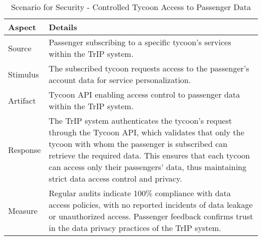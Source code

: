 \begin{table}[H]
    \centering
    \begin{tabularx}{\textwidth}{@{} lX @{}}
    \toprule
    \textbf{Aspect} & \textbf{Details} \\
    \midrule
    Source & Passenger subscribing to a specific tycoon's services within the TrIP system. \\
    Stimulus & The subscribed tycoon requests access to the passenger's account data for service personalization. \\
    Artifact & Tycoon API enabling access control to passenger data within the TrIP system. \\
    Response & The TrIP system authenticates the tycoon's request through the Tycoon API, which validates that only the tycoon with whom the passenger is subscribed can retrieve the required data. This ensures that each tycoon can access only their passengers’ data, thus maintaining strict data access control and privacy. \\
    Measure & Regular audits indicate 100\% compliance with data access policies, with no reported incidents of data leakage or unauthorized access. Passenger feedback confirms trust in the data privacy practices of the TrIP system. \\
    \bottomrule
    \end{tabularx}
    \caption{Scenario for Security - Controlled Tycoon Access to Passenger Data}
    \label{table:tycoon_access_control}
\end{table}
